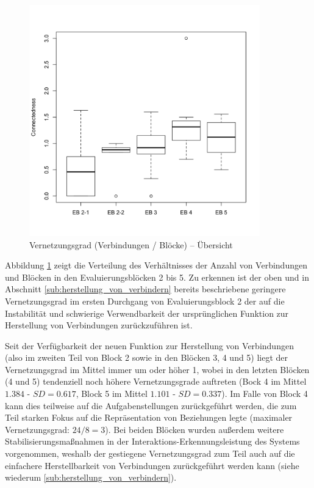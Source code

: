 \begin{figure}[htbp]
	\centering
		\includegraphics[width=10cm]{img/Evaluierung/connectednessOverviewAll.png}
	\caption{Vernetzungsgrad (Verbindungen / Blöcke) -- Übersicht}
	\label{fig:img_Evaluierung_connectednessOverviewAll}
\end{figure}

Abbildung \ref{fig:img_Evaluierung_connectednessOverviewAll} zeigt die Verteilung des Verhältnisses der Anzahl von Verbindungen und Blöcken in den Evaluierungsblöcken 2 bis 5. Zu erkennen ist der oben und in Abschnitt \ref{sub:herstellung_von_verbindern} bereits beschriebene geringere Vernetzungsgrad im ersten Durchgang von Evaluierungsblock 2 der auf die Instabilität und schwierige Verwendbarkeit der ursprünglichen Funktion zur Herstellung von Verbindungen zurückzuführen ist.

Seit der Verfügbarkeit der neuen Funktion zur Herstellung von Verbindungen (also im zweiten Teil von Block 2 sowie in den Blöcken 3, 4 und 5) liegt der Vernetzungsgrad im Mittel immer um oder höher 1, wobei in den letzten Blöcken (4 und 5) tendenziell noch höhere Vernetzungsgrade auftreten (Bock 4 im Mittel $1.384$ - $SD=0.617$, Block 5 im Mittel $1.101$ - $SD=0.337$). Im Falle von Block 4 kann dies teilweise auf die Aufgabenstellungen zurückgeführt werden, die zum Teil starken Fokus auf die Repräsentation von Beziehungen legte (maximaler Vernetzungsgrad: $24/8=3$). Bei beiden Blöcken wurden außerdem weitere Stabilisierungsmaßnahmen in der Interaktions-Erkennungsleistung des Systems vorgenommen, weshalb der gestiegene Vernetzungsgrad zum Teil auch auf die einfachere Herstellbarkeit von Verbindungen zurückgeführt werden kann (siehe wiederum \ref{sub:herstellung_von_verbindern}).

